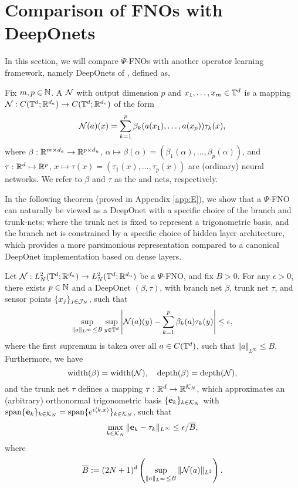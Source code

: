 \documentclass[reqno,a4paper]{amsart}
\begin{document}
\section{Comparison of FNOs with DeepOnets}
\label{sec:4}
In this section, we will compare $\Psi$-FNOs with another operator learning framework, namely DeepOnets of \cite{ChenChen,deeponets}, defined as,
\begin{definition} \label{def:deeponet}
Fix $m,p\in \mathbb{N}$. A  $\mathcal{N}$ with output dimension $p$ and  $x_1,\dots, x_m\in \mathbb{T}^d$ is a mapping $\mathcal{N}: C(\mathbb{T}^d;\mathbb{R}^{d_a}) \to C(\mathbb{T}^d;\mathbb{R}^{d_v})$ of the form 
\[
\mathcal{N}(a)(x) 
=
\sum_{k=1}^p \beta_k(a(x_1),\dots, a(x_p)) \tau_k(x),
\]
where $\beta: \mathbb{R}^{m\times d_a} \to \mathbb{R}^{p\times d_u}$, $\alpha \mapsto \beta(\alpha) = (\beta_1(\alpha),\dots, \beta_p(\alpha))$, and $\tau: \mathbb{R}^d \mapsto \mathbb{R}^{p}$, $x\mapsto \tau(x) = (\tau_1(x),\dots,\tau_p(x))$ are (ordinary) neural networks. We refer to $\beta$ and $\tau$ as the  and  nets, respectively.
\end{definition}
In the following theorem (proved in Appendix \ref{app:E}), we show that a $\Psi$-FNO can naturally be viewed as a DeepOnet with a specific choice of the branch and trunk-nets; where the trunk net is fixed to represent a trigonometric basis, and the branch net is constrained by a specific choice of hidden layer architecture, which provides a more parsimonious representation compared to a canonical DeepOnet implementation based on dense layers.
\begin{theorem}
\label{thm:deeponet}
Let $\mathcal{N}: L^2_N(\mathbb{T}^d;\mathbb{R}^{d_a}) \to L^2_N(\mathbb{T}^d;\mathbb{R}^{d_u})$ be a $\Psi$-FNO, and fix $B>0$. For any $\epsilon > 0$, there exists $p\in \mathbb{N}$ and a DeepOnet $(\beta,\tau)$, with branch net $\beta$, trunk net $\tau$, and sensor points $\{x_j\}_{j\in \mathcal{J}_N}$, such that 
\[
\sup_{\Vert a\Vert_{L^\infty}\le B} 
\sup_{y \in \mathbb{T}^d}
\left|
\mathcal{N}(a)(y) - \sum_{k=1}^p \beta_k(a) \tau_k(y)
\right|
\le \epsilon,
\]
where the first supremum is taken over all $a\in C(\mathbb{T}^d)$, such that $\Vert a \Vert_{L^\infty} \le B$.
Furthermore, we have 
\[
\mathrm{width}(\beta) = \mathrm{width}(\mathcal{N}), 
\quad
\mathrm{depth}(\beta) = \mathrm{depth}(\mathcal{N}),
\]
and the trunk net $\tau$ defines a mapping $\tau: \mathbb{R}^{d} \to \mathbb{R}^{\mathcal{K}_N}$, which approximates an (arbitrary) orthonormal trigonometric basis $\{\bm{\mathrm{e}}_k\}_{k\in \mathcal{K}_N}$ with $\mathrm{span}\{\bm{\mathrm{e}}_k\}_{k\in \mathcal{K}_N} = \mathrm{span}\{e^{i\langle k, x\rangle}\}_{k\in \mathcal{K}_N}$, such that 
\[
\max_{k\in \mathcal{K}_N} \Vert \bm{\mathrm{e}}_k - \tau_k \Vert_{L^\infty} \le \epsilon / \overline{B},
\]
where
\[
\overline{B} := 
(2N+1)^d
\left(
\sup_{\Vert a \Vert_{L^\infty}\le B} \Vert \mathcal{N}(a) \Vert_{L^2}
\right).
\]
\end{theorem}
\end{document}
